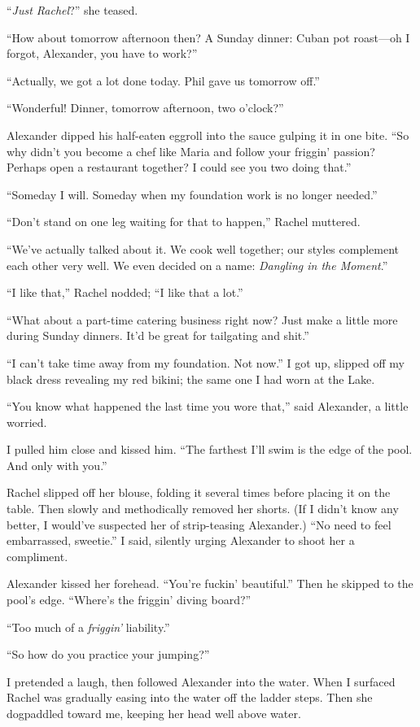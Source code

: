 ``\emph{Just Rachel}?'' she teased.

``How about tomorrow afternoon then? A Sunday dinner: Cuban pot
roast---oh I forgot, Alexander, you have to work?''

``Actually, we got a lot done today. Phil gave us tomorrow off.''

``Wonderful! Dinner, tomorrow afternoon, two o'clock?''

Alexander dipped his half-eaten eggroll into the sauce gulping it in one
bite. ``So why didn't you become a chef like Maria and follow your
friggin' passion? Perhaps open a restaurant together? I could see you
two doing that.''

``Someday I will. Someday when my foundation work is no longer needed.''

``Don't stand on one leg waiting for that to happen,'' Rachel muttered.

``We've actually talked about it. We cook well together; our styles
complement each other very well. We even decided on a name:
\emph{Dangling in the Moment}.''

``I like that,'' Rachel nodded; ``I like that a lot.''

``What about a part-time catering business right now? Just make a little
more during Sunday dinners. It'd be great for tailgating and shit.''

``I can't take time away from my foundation. Not now.'' I got up,
slipped off my black dress revealing my red bikini; the same one I had
worn at the Lake.

``You know what happened the last time you wore that,'' said Alexander,
a little worried.

I pulled him close and kissed him. ``The farthest I'll swim is the edge
of the pool. And only with you.''

Rachel slipped off her blouse, folding it several times before placing
it on the table. Then slowly and methodically removed her shorts. (If I
didn't know any better, I would've suspected her of strip-teasing
Alexander.) ``No need to feel embarrassed, sweetie.'' I said, silently
urging Alexander to shoot her a compliment.

Alexander kissed her forehead. ``You're fuckin' beautiful.'' Then he
skipped to the pool's edge. ``Where's the friggin' diving board?''

``Too much of a \emph{friggin'} liability.''

``So how do you practice your jumping?''

I pretended a laugh, then followed Alexander into the water. When I
surfaced Rachel was gradually easing into the water off the ladder
steps. Then she dogpaddled toward me, keeping her head well above water.

